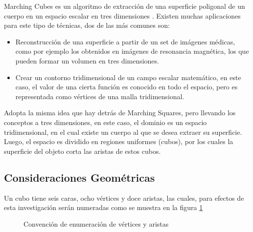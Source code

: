 Marching Cubes es un algoritmo de extracción de una superficie poligonal de un cuerpo
en un espacio escalar en tres dimensiones \cite{Lorensen87marchingcubes}. Existen muchas aplicaciones para este tipo de técnicas,
dos de las más comunes son:

\begin{itemize}
	\item Reconstrucción de una superficie a partir de un set de imágenes médicas, como
	por ejemplo los obtenidos en imágenes de resonancia magnética, los que pueden formar
	un volumen en tres dimensiones.

	\item Crear un contorno tridimensional de un campo escalar matemático, en este caso,
	el valor de una cierta función es conocido en todo el espacio, pero es representada como
	vértices de una malla tridimensional.
\end{itemize}

Adopta la misma idea que hay detrás de Marching Squares, pero llevando los conceptos a
tres dimensiones, en este caso, el dominio es un espacio tridimensional, en el cual existe un
cuerpo al que se desea extraer su superficie. Luego, el espacio es dividido en regiones uniformes
(cubos), por los cuales la superficie del objeto corta las aristas de estos cubos.

\subsection{Consideraciones Geométricas}
\label{subsec:marchingCubes:consideracionesGeometricas}

Un cubo tiene seis caras, ocho vértices y doce aristas, las cuales, para efectos de esta
investigación serán numeradas como se muestra en la figura \ref{f:estadoDelArte:convention}

\begin{figure}[hbp]
\centering
\caption{Convención de enumeración de vértices y aristas}
\label{f:estadoDelArte:convention}
\end{figure}

